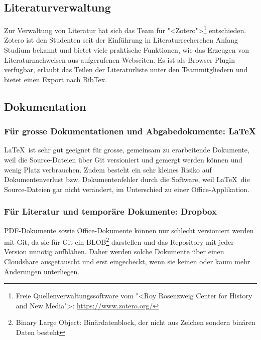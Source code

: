 				
		\subsection{Literaturverwaltung}
			Zur Verwaltung von Literatur hat sich das Team für "<Zotero">\footnote{Freie Quellenverwaltungssoftware vom "<Roy Rosenzweig Center for History and New Media">: \url{https://www.zotero.org/}} entschieden.
			Zotero ist den Studenten seit der Einführung in Literaturrecherchen Anfang Studium bekannt und
			bietet viele praktische Funktionen, wie das Erzeugen von Literaturnachweisen aus aufgerufenen Webseiten.
			Es ist als Browser Plugin verfügbar, erlaubt das Teilen der Literaturliste unter den Teammitgliedern und bietet einen Export nach BibTex.
			

		\subsection{Dokumentation}
			\subsubsection{Für grosse Dokumentationen und Abgabedokumente: \LaTeX}
				\LaTeX\ ist sehr gut geeignet für grosse, gemeinsam zu erarbeitende Dokumente,
				weil die Source-Dateien über Git versioniert und gemergt werden können und wenig
				Platz verbrauchen. 
				Zudem besteht ein sehr kleines Risiko auf Dokumentenverlust
				bzw. Dokumentenfehler durch die Software, weil \LaTeX\ die Source-Dateien gar
				nicht verändert, im Unterschied zu einer Office-Applikation.
				
			\subsubsection{Für Literatur und temporäre Dokumente: Dropbox}
			PDF-Dokumente sowie Office-Dokumente können nur schlecht versioniert werden mit Git, 
			da sie für Git ein BLOB\footnote{Binary Large Object: Binärdatenblock, der nicht aus Zeichen sondern binären Daten besteht} darstellen
			und das Repository mit jeder Version unnötig aufblähen.
			Daher werden solche Dokumente über einen Cloudshare ausgetauscht und erst eingecheckt, 
			wenn sie keinen oder kaum mehr Änderungen unterliegen.
				
